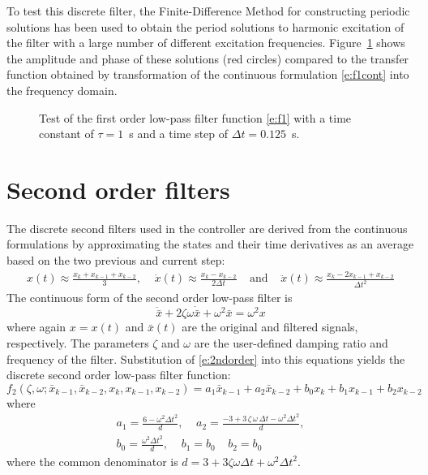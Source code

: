 To test this discrete filter, the Finite-Difference Method for constructing periodic solutions \cite{Nayfeh95} has been used to obtain the period solutions to harmonic excitation of the filter with a large number of different excitation frequencies. Figure~\ref{f:f1} shows the amplitude and phase of these solutions (red circles) compared to the transfer function obtained by transformation of the continuous formulation \eqref{e:f1cont} into the frequency domain.

\begin{figure}[t]
\centerline{ }
\caption{Test of the first order low-pass filter function \eqref{e:f1} with a time constant of $\tau=1$~s and a time step of $\Delta t = 0.125$~s. \label{f:f1}}
\end{figure}


\section{Second order filters}

The discrete second filters used in the controller are derived from the continuous formulations by approximating the states and their time derivatives as an average based on the two previous and current step:
\begin{align}\label{e:2ndorder}
x(t) \approx \frac{x_k+x_{k-1}+x_{k-2}}3,  \;\;\;\;\dot x(t)\approx \frac{x_k-x_{k-2}}{2\Delta t} \;\;\;\;\mbox{and} \;\;\;\;\ddot x(t)\approx \frac{x_k-2 x_{k-1}+ x_{k-2}}{\Delta t^2}
\end{align}
The continuous form of the second order low-pass filter is
\begin{equation}
\label{e:f2cont}
\ddot{\bar x} + 2 \zeta \omega \dot{\bar x} + \omega^2\bar x = \omega^2 x
\end{equation}
where again $x=x(t)$ and $\bar x(t)$ are the original and filtered signals, respectively. The parameters $\zeta$ and $\omega$ are the user-defined damping ratio and frequency of the filter. Substitution of \eqref{e:2ndorder} into this equations yields the discrete second order low-pass filter function:
\begin{equation}
\label{e:f2}
f_2 \left(\zeta, \omega; \bar x_{k-1} , \bar x_{k-2} , x_{k} , x_{k-1} , x_{k-2} \right) = a_1 \bar x_{k-1} + a_2 \bar x_{k-2} + b_0 x_k + b_1 x_{k-1}+ b_2 x_{k-2}
\end{equation}
where
\begin{gather}\nonumber
a_1=\frac {6-\omega^2 \Delta t^2}{d},
\;\;\;\;
a_2=\frac {-3+3\,\zeta\,\omega\,\Delta t-\omega^2\Delta t^2}{d}, \\
\label{e:f2coef}
b_0= \frac {\omega^2\Delta t^2}{d}, \;\;\;\; b_1 = b_0\;\;\;\; b_2 = b_0
\end{gather}
where the common denominator is $d=3+3 \zeta \omega \Delta t+\omega^2 \Delta t^2$.


